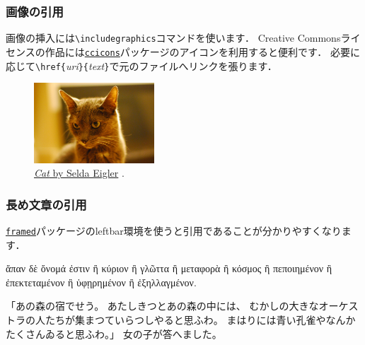 \documentclass[%
    hyperref={colorlinks,linkcolor=sDarkBlue,urlcolor=sDarkBlue,citecolor=sDarkBlue}
]{beamer}
\newenvironment{quoteblock}{%
    \def\FrameCommand{%
        {\color{sLightGray}{\vrule width 3pt}}%
        \hspace{10pt}
    }%
    \MakeFramed {\advance\hsize-\width \FrameRestore}}%
{\endMakeFramed}
\begin{document}
    \begin{frame}[fragile]
        \frametitle{画像の引用}
        画像の挿入には\verb+\includegraphics+コマンドを使います．
        Creative Commonsライセンスの作品には\href{https://ctan.org/pkg/ccicons}{\texttt{ccicons}}パッケージのアイコンを利用すると便利です．
        必要に応じて\verb+\href{+\emph{uri}\verb+}{+\emph{text}\verb+}+で元のファイルへリンクを張ります．

        \bigskip

        \begin{figure}
            \includegraphics[width=0.4\textwidth]{cat.jpg}
            \caption{\href{https://www.flickr.com/photos/selda_eigler/8687127864/in/photolist-eeDNsC-qWFs4R-7CNDjJ-9c8DxY-eeDNhC-UCZ63T-dJNGUc-e5Nk39-988EVA-kUgwo-owDcVP-jQGjjt-5zkGTy-7WRCUo-b91XbZ-Mj8Ku-5pzwSA-9Bct2H-7CNHMY-7CJJMB-8MyEYn-9x45Mp-7JTq8M-ZrpGJ9-8fRht4-4SxVZT-5pzwjJ-ZsPJjL-aE44GL-dF6uWD-kqbHgM-5F373J-ZsQrVG-qyD7E9-ajyDPL-4WDvTp-KbDSc-5kCxD9-4MdeUo-pgDQcG-pPWrXD-662AFD-oTnC8k-apYceQ-nJSaaY-7CJLZv-7CJJMn-7CNFsU-XNMWkw-ccdtT9}{\emph{Cat} by Selda Eigler} \ccby.}
        \end{figure}

    \end{frame}

    \begin{frame}
        \frametitle{長め文章の引用}
        \href{https://ctan.org/pkg/framed}{\texttt{framed}}パッケージのleftbar環境を使うと引用であることが分かりやすくなります．

        \begin{quoteblock}
    ἅπαν δὲ ὄνομά ἐστιν ἢ κύριον ἢ γλῶττα ἢ μεταφορὰ ἢ κόσμος ἢ πεποιημένον ἢ ἐπεκτεταμένον ἢ ὑφῃρημένον ἢ ἐξηλλαγμένον.

    \hfill {}
        \end{quoteblock}

        \begin{quoteblock}
            「あの森の宿でせう。
            あたしきつとあの森の中には、
            むかしの大きなオーケストラの人たちが集まつていらつしやると思ふわ。
            まはりには青い孔雀やなんかたくさんゐると思ふわ。」
            女の子が答へました。

            \hfill {}
        \end{quoteblock}
    \end{frame}
\end{document}
